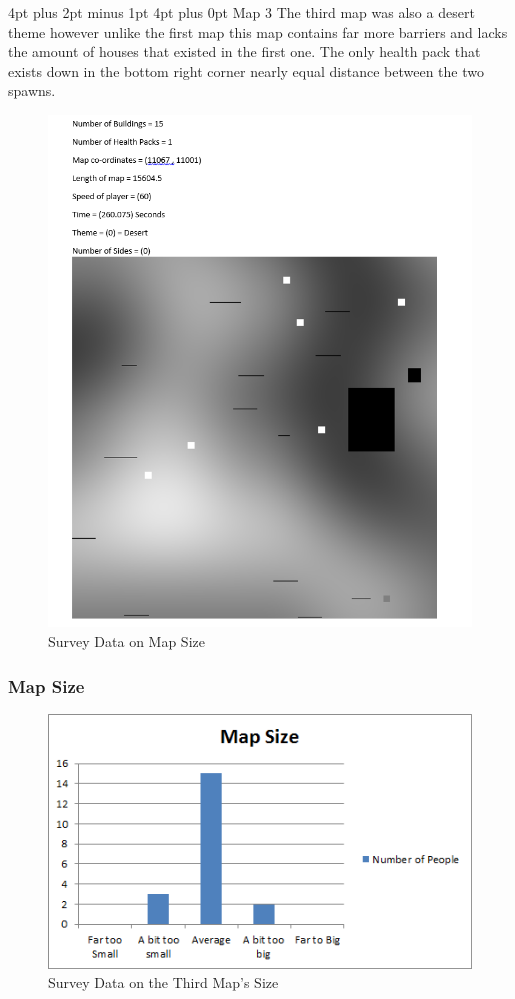\documentclass[12pt,a4paper,oneside]{book}
\makeatletter
\renewcommand\section{\@startsection {section}{1}{0mm} %
                               {4pt plus 2pt minus 1pt} %
                               {4pt plus 0pt} %
                               {\bfseries}}
\makeatother
\begin{document}
\section {Map 3}
The third map was also a desert theme however unlike the first map this map contains far more barriers and lacks the amount of houses that existed in the first one. The only health pack that exists down in the bottom right corner nearly equal distance between the two spawns. 
\begin{figure}[H]
	\includegraphics[width=1.0\textwidth]{images/map3.png}
	\caption{Survey Data on Map Size}
\end{figure}
\subsubsection{Map Size}
\begin{figure}[H]
	\includegraphics[width=1.0\textwidth]{images/Size3.png}
	\caption{Survey Data on the Third Map's Size}
\end{figure}
\end{document}
